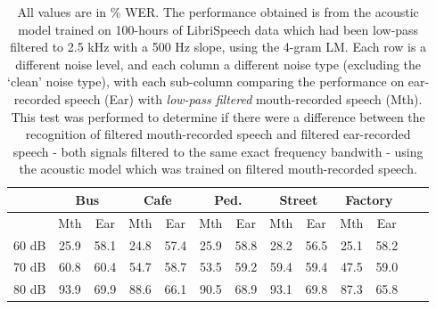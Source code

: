 \begin{table}[h]
\begin{center}
\begin{tabular}{| c || c | c | c | c | c | c | c | c | c | c | c | c |} \hline
      & \multicolumn{2}{|c|}{Bus} & \multicolumn{2}{|c|}{Cafe} & \multicolumn{2}{|c|}{Ped.} & \multicolumn{2}{|c|}{Street} & \multicolumn{2}{|c|}{Factory} \\ \hline
      & Mth & Ear & Mth & Ear & Mth & Ear & Mth & Ear & Mth & Ear \\ \hline\hline
60 dB & 25.9 & 58.1 & 24.8 & 57.4 & 25.9 & 58.8 & 28.2 & 56.5 & 25.1 & 58.2  \\ \hline
70 dB & 60.8 & 60.4 & 54.7 & 58.7 & 53.5 & 59.2 & 59.4 & 59.4 & 47.5 & 59.0  \\ \hline
80 dB & 93.9 & 69.9 & 88.6 & 66.1 & 90.5 & 68.9 & 93.1 & 69.8 & 87.3 & 65.8  \\ \hline
\end{tabular}
\end{center}
\caption{All values are in \% WER. The performance obtained is from the acoustic model trained on 100-hours of LibriSpeech data which had been low-pass filtered to 2.5 kHz with a 500 Hz slope, using the 4-gram LM. Each row is a different noise level, and each column a different noise type (excluding the `clean' noise type), with each sub-column comparing the performance on ear-recorded speech (Ear) with \textit{low-pass filtered} mouth-recorded speech (Mth). This test was performed to determine if there were a difference between the recognition of filtered mouth-recorded speech and filtered ear-recorded speech - both signals filtered to the same exact frequency bandwith - using the acoustic model which was trained on filtered mouth-recorded speech.}\label{tab:lp-ers-mrs}
\end{table}

